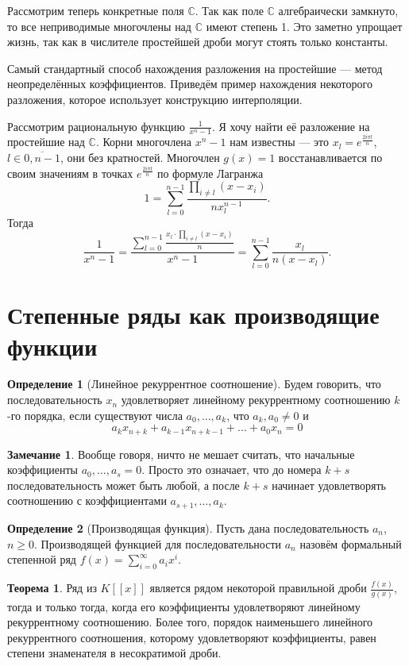 \documentclass[10pt,a4paper,oneside]{book} %
\theoremstyle{definition}
\newtheorem*{rem}{Замечание}
\newtheorem*{defn}{Определение}
\newtheorem{thm}{Теорема}
\newcommand{\mb}[1]{\mathbb{#1}}
\newcommand{\ovl}{\overline}
\def\thrm{\begin{thm}}
\def\ethrm{\end{thm}}
\def\dfn{\begin{defn}}
\def\edfn{\end{defn}}
\def\rm{\begin{rem}}
\def\erm{\end{rem}}
\begin{document}
Рассмотрим теперь конкретные поля $\mb C$. Так как поле $\mb C$ алгебраически замкнуто, то все неприводимые многочлены над $\mb C$ имеют степень 1. Это заметно упрощает жизнь, так как в числителе простейшей дроби могут стоять только константы. 

Самый стандартный способ нахождения разложения на простейшие --- метод неопределённых коэффициентов. Приведём пример нахождения некоторого разложения, которое использует конструкцию интерполяции.

Рассмотрим рациональную функцию $\frac{1}{x^{n}-1}$. Я хочу найти её разложение на простейшие над $\mb C$. Корни  многочлена $x^{n}-1$ нам известны --- это $x_l=e^{\tfrac{2i \pi l}{n}}$, $l\in \ovl{0,n-1}$, они без кратностей. Многочлен $g(x)=1$ восстанавливается по своим значениям в точках  $e^{\tfrac{2i \pi l}{n}}$ по формуле Лагранжа
$$1=\sum_{l=0}^{n-1} \frac{ \prod_{i\neq l} (x-x_i)}{nx_l^{n-1}}.$$
Тогда 
$$\frac{1}{x^{n}-1}=\frac{\sum_{l=0}^{n-1} \frac{ x_l\cdot \prod_{i\neq l} (x-x_i)}{n}}{x^{n}-1}= \sum_{l=0}^{n-1} \frac{x_l}{n(x-x_l)}.$$



\section{Степенные ряды как производящие функции}


\dfn[Линейное рекуррентное соотношение] Будем говорить, что последовательность $x_n$ удовлетворяет линейному рекуррентному соотношению $k$-го порядка, если существуют числа $a_0,\dots,a_{k}$, что $a_k,a_0\neq 0$ и 
$$a_k x_{n+k}+a_{k-1}x_{n+k-1}+\dots+a_0x_n=0$$
\edfn


\rm Вообще говоря, ничто не мешает считать, что начальные коэффициенты $a_0,\dots,a_s=0$. Просто это означает, что до номера $k+s$ последовательность может быть любой, а после $k+s$ начинает удовлетворять соотношению с коэффициентами $a_{s+1},\dots,a_k$.
\erm

\dfn[Производящая функция] Пусть дана последовательность $a_n$, $n\geq 0$. Производящей функцией для последовательности $a_n$ назовём формальный степенной ряд $f(x)=\sum_{i=0}^{\infty} a_ix^i$.
\edfn



\thrm Ряд из $K[[x]]$ является рядом некоторой правильной дроби $\frac{f(x)}{g(x)}$, тогда и только тогда, когда его коэффициенты  удовлетворяют линейному рекуррентному соотношению. Более того, порядок наименьшего линейного рекуррентного соотношения, которому удовлетворяют коэффициенты, равен степени знаменателя в несократимой дроби.
\ethrm
\end{document}
